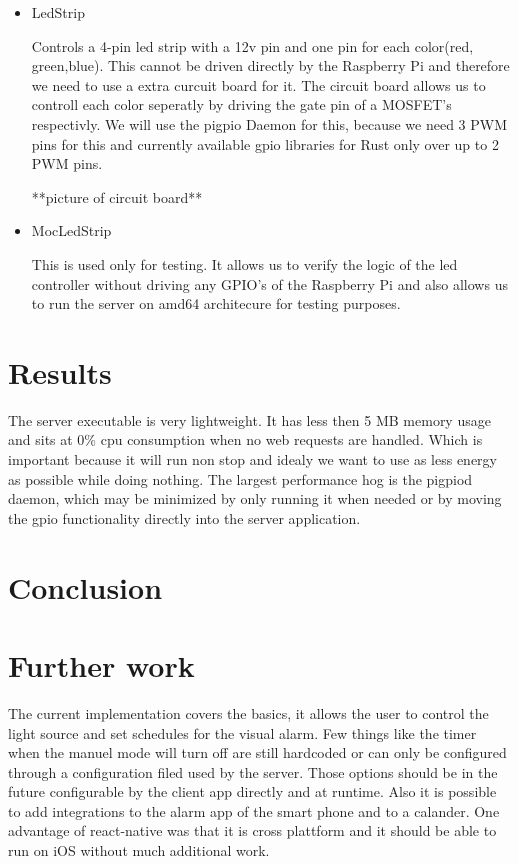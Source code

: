 \documentclass[conference]{IEEEtran}
\begin{document}
\begin{itemize}
    \item LedStrip
    
    Controls a 4-pin led strip with a 12v pin and one pin for each color(red, green,blue). This cannot be driven directly by the
    Raspberry Pi and therefore we need to use a extra curcuit board\cite{rpiled} for it. The circuit board allows us to controll each
    color seperatly by driving the gate pin of a MOSFET's respectivly. We will use the pigpio Daemon\cite{pigpiod} for this, 
    because we need 3 PWM pins for this and currently available gpio libraries for Rust only over up to 2 PWM pins.
    
    **picture of circuit board**

    \item MocLedStrip
    
    This is used only for testing. It allows us to verify the logic of the led controller without driving any GPIO's of the
    Raspberry Pi and also allows us to run the server on amd64 architecure for testing purposes.
\end{itemize}



\section{Results}
The server executable is very lightweight. It has less then 5 MB memory usage and sits at 0\% cpu consumption when no web
requests are handled. Which is important because it will run non stop and idealy we want to use as less energy as possible while
doing nothing. The largest performance hog is the pigpiod daemon, which may be minimized by only running it when needed or by moving
the gpio functionality directly into the server application.


\section{Conclusion}



\section{Further work}
The current implementation covers the basics, it allows the user to control the light source and set schedules for the visual alarm.
Few things like the timer when the manuel mode will turn off are still hardcoded or can only be configured through a configuration
filed used by the server. Those options should be in the future configurable by the client app directly and at runtime. Also it
is possible to add integrations to the alarm app of the smart phone and to a calander. One advantage of react-native was that it
is cross plattform and it should be able to run on iOS without much additional work.
\end{document}
